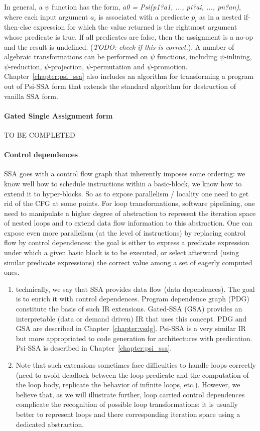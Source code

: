 In general, a $\psi$ function has the form, {\em a0 = Psi(p1?a1, ..., pi?ai, ..., pn?an)}, where each input argument $a_i$ is associated with a predicate $p_i$ as in a nested if-then-else expression for which the value returned is the rightmost argument whose predicate is true.  If all predicates are false, then the assignment is a no-op and the result is undefined.  ({\em TODO: check if this is correct.}).   A number of algebraic transformations can be performed on $\psi$ functions, including 
$\psi$-inlining, $\psi$-reduction, $\psi$-projection, $\psi$-permutation and $\psi$-promotion.  Chapter~\ref{chapter:psi_ssa} also includes an algorithm for transforming a program out of Psi-SSA form that extends the standard algorithm for destruction of vanilla SSA form. 


\paragraph{Gated Single Assignment form}

TO BE COMPLETED

\paragraph{Control dependences}
SSA goes with a control flow graph that inherently imposes some ordering: we know well how to schedule instructions within a basic-block, we know how to extend it to hyper-blocks. So as to expose parallelism / locality one need to get rid of the CFG at some points. For loop transformations, software pipelining, one need  to manipulate a higher degree of abstraction to represent the iteration space of nested loops and to extend data flow information to this abstraction. One can expose even more parallelism (at the level of instructions) by replacing control flow by control dependences: the goal is either to express a predicate expression under which a given basic block is to be executed, or select afterward (using similar predicate expressions) the correct value among a set of eagerly computed ones.
\begin{enumerate}
\item technically, we say that SSA provides data flow (data dependences). The goal is to enrich it with control dependences. Program dependence graph (PDG) constitute the basis of such IR extensions. Gated-SSA (GSA) provides an interpretable (data or demand driven) IR that uses this concept. PDG and GSA are described in Chapter~\ref{chapter:vsdg}. Psi-SSA is a very similar IR but more appropriated to code generation for architectures with predication. Psi-SSA is described in Chapter~\ref{chapter:psi_ssa}.
\item Note that such extensions sometimes face difficulties to handle loops correctly (need to avoid deadlock between the loop predicate and the computation of the loop body, replicate the behavior of infinite loops, etc.). However, we believe that, as we will illustrate further, loop carried control dependences complicate the recognition of possible loop transformations: it is usually better to represent loops and there corresponding iteration space using a dedicated abstraction. 
\end{enumerate}

